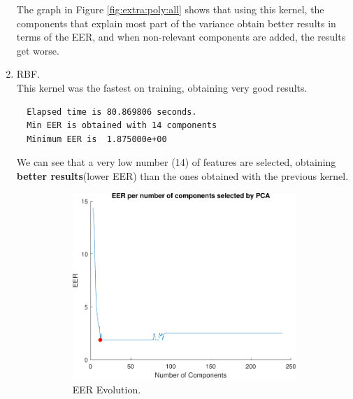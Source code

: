 \documentclass[a4paper]{article}
\begin{document}
\begin{enumerate}
The graph in Figure \ref{fig:extra:poly:all} shows that using this kernel, the components that explain most part of the variance obtain better results in terms of the EER, and when non-relevant components are added, the results get worse.

\item RBF.\\

This kernel was the fastest on training, obtaining very good results.
\begin{verbatim}
  Elapsed time is 80.869806 seconds.
  Min EER is obtained with 14 components
  Minimum EER is  1.875000e+00
\end{verbatim}

We can see that a very low number (14) of features are selected, obtaining \textbf{better results}(lower EER) than the ones obtained with the previous kernel.
\begin{figure}[H]
  \centering
       \begin{subfigure}[t]{0.45\textwidth}
         \centering
         \includegraphics[scale=0.5]{Figures/SVM-RBF-1TOMAX}
         \caption{EER Evolution.}
     \end{subfigure}%
     \quad
     \begin{subfigure}[t]{0.45\textwidth}
         \centering

\end{subfigure}
\end{figure}
\end{enumerate}
\end{document}
